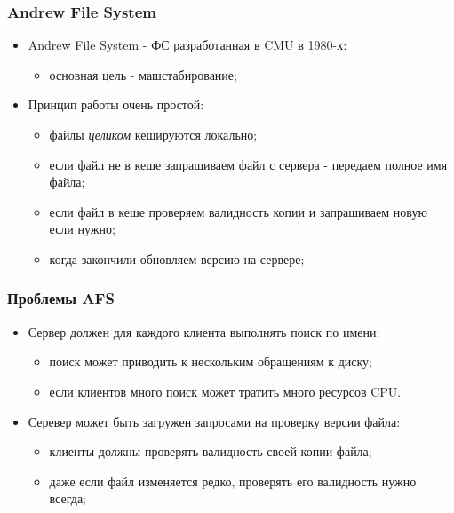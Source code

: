 \begin{frame}
\frametitle{Andrew File System}
\begin{itemize}
  \item<1-> Andrew File System - ФС разработанная в CMU в 1980-х:
    \begin{itemize}
      \item основная цель - машстабирование;
    \end{itemize}
  \item<2-> Принцип работы очень простой:
    \begin{itemize}
      \item файлы \emph{целиком} кешируются локально;
      \item если файл не в кеше запрашиваем файл с сервера - передаем полное имя файла;
      \item если файл в кеше проверяем валидность копии и запрашиваем новую если нужно;
      \item когда закончили обновляем версию на сервере;
    \end{itemize}
\end{itemize}
\end{frame}

\begin{frame}
\frametitle{Проблемы AFS}
\begin{itemize}
  \item<1-> Сервер должен для каждого клиента выполнять поиск по имени:
    \begin{itemize}
      \item поиск может приводить к нескольким обращениям к диску;
      \item если клиентов много поиск может тратить много ресурсов CPU.
    \end{itemize}
  \item<2-> Серевер может быть загружен запросами на проверку версии файла:
    \begin{itemize}
      \item клиенты должны проверять валидность своей копии файла;
      \item даже если файл изменяется редко, проверять его валидность нужно всегда;
    \end{itemize}
\end{itemize}
\end{frame}

